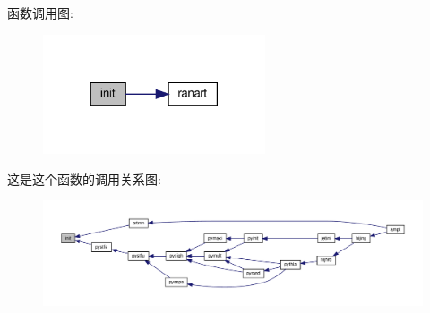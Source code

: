 函数调用图\+:
\nopagebreak
\begin{figure}[H]
\begin{center}
\leavevmode
\includegraphics[width=186pt]{init_8f90_a925211caea512f352d748dcedd82d0ff_cgraph}
\end{center}
\end{figure}
这是这个函数的调用关系图\+:
\nopagebreak
\begin{figure}[H]
\begin{center}
\leavevmode
\includegraphics[width=350pt]{init_8f90_a925211caea512f352d748dcedd82d0ff_icgraph}
\end{center}
\end{figure}
